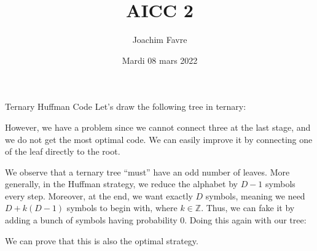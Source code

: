 \documentclass[a4paper]{article}
\title{AICC 2}
\author{Joachim Favre}
\date{Mardi 08 mars 2022}
\begin{document}
\maketitle


\begin{parag}{Ternary Huffman Code}
    Let's draw the following tree in ternary:

    However, we have a problem since we cannot connect three at the last stage, and we do not get the most optimal code. We can easily improve it by connecting one of the leaf directly to the root.

    We observe that a ternary tree ``must'' have an odd number of leaves. More generally, in the Huffman strategy, we reduce the alphabet by $D - 1$ symbols every step. Moreover, at the end, we want exactly $D$ symbols, meaning we need $D + k\left(D - 1\right)$ symbols to begin with, where $k \in \mathbb{Z}$. Thus, we can fake it by adding a bunch of symbols having probability 0. Doing this again with our tree:

    We can prove that this is also the optimal strategy.
\end{parag}
\end{document}

